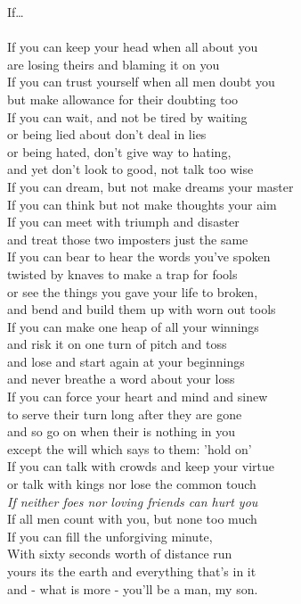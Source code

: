 
\usepackage{fullpage}

{\Large If\ldots}\\
\\
If you can keep your head when all about you\\
are losing theirs and blaming it on you\\
If you can trust yourself when all men doubt you\\
but make allowance for their doubting too\\
If you can wait, and not be tired by waiting\\
or being lied about don't deal in lies\\
or being hated, don't give way to hating,\\
and yet don't look to good, not talk too wise\\

If you can dream, but not make dreams your master\\
If you can think but not make thoughts your aim\\
If you can meet with triumph and disaster\\
and treat those two imposters just the same\\
If you can bear to hear the words you've spoken\\
twisted by knaves to make a trap for fools\\
or see the things you gave your life to broken,\\
and bend and build them up with worn out tools\\

If you can make one heap of all your winnings\\
and risk it on one turn of pitch and toss\\
and lose and start again at your beginnings\\
and never breathe a word about your loss\\
If you can force your heart and mind and sinew\\
to serve their turn long after they are gone\\
and so go on when their is nothing in you\\
except the will which says to them: 'hold on'\\

If you can talk with crowds and keep your virtue\\
or talk with kings nor lose the common touch\\
\emph{If neither foes nor loving friends can hurt you}\\
If all men count with you, but none too much\\
If you can fill the unforgiving minute,\\
With sixty seconds worth of distance run\\
yours its the earth and everything that's in it\\
and - what is more - you'll be a man, my son.\\

